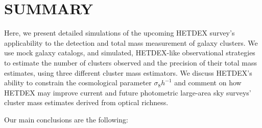 \documentclass[fleqn,usenatbib]{mnras}
\begin{document}
\section{SUMMARY}\label{sec:summary}
Here, we present detailed simulations of the upcoming HETDEX survey's applicability to the detection and total mass measurement of galaxy clusters. We use mock galaxy catalogs, and simulated, HETDEX-like observational strategies to estimate the number of clusters observed and the precision of their total mass estimates, using three different cluster mass estimators. We discuss HETDEX's ability to constrain the cosmological parameter $\sigma_8 h^{-1}$ and comment on how HETDEX may improve current and future photometric large-area sky surveys' cluster mass estimates derived from optical richness.

Our main conclusions are the following:
\end{document}
